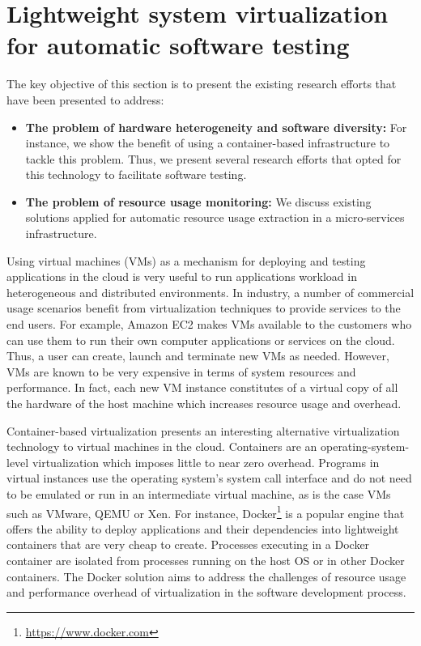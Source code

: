 \section{Lightweight system virtualization for automatic software testing}
\label{sec:Lightweight system virtualization for software testing}

The key objective of this section is to present the existing research efforts that have been presented to address:
\begin{itemize}
	\item \textbf{The problem of hardware heterogeneity and software diversity:} For instance, we show the benefit of using a container-based infrastructure to tackle this problem. Thus, we present several research efforts that opted for this technology to facilitate software testing. 
	
	\item \textbf{The problem of resource usage monitoring:} We discuss existing solutions applied for automatic resource usage extraction in a micro-services infrastructure. 
\end{itemize}


Using virtual machines (VMs) as a mechanism for deploying and testing applications in the cloud is very useful to run applications workload in heterogeneous and distributed environments.
In industry, a number of commercial usage scenarios benefit from virtualization techniques to provide services to the end users. For example, Amazon EC2 makes VMs available to the customers who can use them to run their own computer applications or services on the cloud. Thus, a user can create, launch and terminate new VMs as needed.  
However, VMs are known to be very expensive in terms of system resources and performance. In fact, each new VM instance constitutes of a virtual copy of all the hardware of the host machine which increases resource usage and overhead\cite{merkel2014docker}. 

Container-based virtualization presents an interesting alternative virtualization technology to virtual machines in the cloud. Containers are an operating-system-level virtualization which imposes little to near zero overhead. Programs in virtual instances use the operating system's system call interface and do not need to be emulated or run in an intermediate virtual machine, as is the case VMs such as VMware, QEMU or Xen.
For instance, Docker\footnote{\url{https://www.docker.com}} is a popular engine that offers the ability to deploy applications and their dependencies into lightweight containers that are very cheap to create. Processes executing in a Docker container are isolated from processes running on the host OS or in other Docker containers. The Docker solution aims to address the challenges of resource usage and performance overhead of virtualization in the software development process. 

